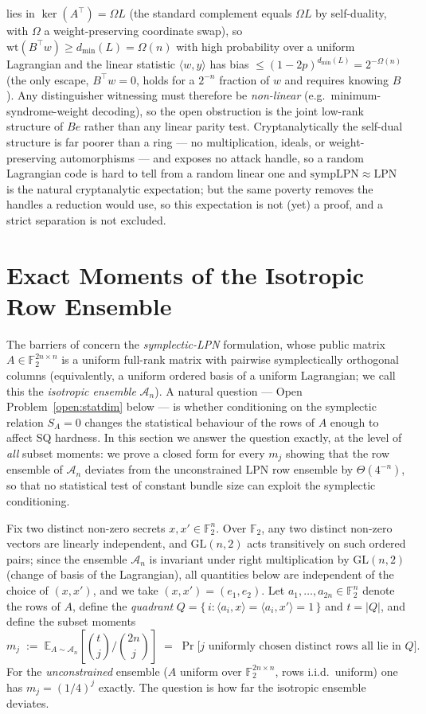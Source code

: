 \documentclass[11pt,a4paper]{article}
\theoremstyle{plain}
\theoremstyle{definition}
\newcommand{\F}{\mathbb{F}}
\newcommand{\E}{\mathbb{E}}
\begin{document}
lies in $\ker(A^{\top})=\Omega L$ (the standard complement equals $\Omega L$ by self-duality, with $\Omega$ a weight-preserving coordinate swap), so $\mathrm{wt}(B^{\top}w)\ge d_{\min}(L)=\Omega(n)$ with high probability over a uniform Lagrangian and the linear statistic $\langle w,y\rangle$ has bias $\le(1-2p)^{d_{\min}(L)}=2^{-\Omega(n)}$ (the only escape, $B^{\top}w=0$, holds for a $2^{-n}$ fraction of $w$ and requires knowing $B$). Any distinguisher witnessing  must therefore be \emph{non-linear} (e.g.\ minimum-syndrome-weight decoding), so the open obstruction is the joint low-rank structure of $Be$ rather than any linear parity test. Cryptanalytically the self-dual structure is far poorer than a ring --- no multiplication, ideals, or weight-preserving automorphisms --- and exposes no attack handle, so a random Lagrangian code is hard to tell from a random linear one and $\mathrm{sympLPN}\approx\mathrm{LPN}$ is the natural cryptanalytic expectation; but the same poverty removes the handles a reduction would use, so this expectation is not (yet) a proof, and a strict separation is not excluded.


\section{Exact Moments of the Isotropic Row Ensemble}
\label{sec:moments}

The barriers of  concern the \emph{symplectic-LPN} formulation, whose public matrix $A \in \F_2^{2n \times n}$ is a uniform full-rank matrix with pairwise symplectically orthogonal columns (equivalently, a uniform ordered basis of a uniform Lagrangian; we call this the \emph{isotropic ensemble} $\mathcal{A}_n$). A natural question --- Open Problem~\ref{open:statdim} below --- is whether conditioning on the symplectic relation $S_A = 0$ changes the statistical behaviour of the rows of $A$ enough to affect SQ hardness. In this section we answer the question exactly, at the level of \emph{all} subset moments: we prove a closed form for every $m_j$ showing that the row ensemble of $\mathcal{A}_n$ deviates from the unconstrained LPN row ensemble by $\Theta(4^{-n})$, so that no statistical test of constant bundle size can exploit the symplectic conditioning.

Fix two distinct non-zero secrets $x, x' \in \F_2^n$. Over $\F_2$, any two distinct non-zero vectors are linearly independent, and $\mathrm{GL}(n,2)$ acts transitively on such ordered pairs; since the ensemble $\mathcal{A}_n$ is invariant under right multiplication by $\mathrm{GL}(n,2)$ (change of basis of the Lagrangian), all quantities below are independent of the choice of $(x,x')$, and we take $(x,x') = (e_1, e_2)$. Let $a_1, \dots, a_{2n} \in \F_2^n$ denote the rows of $A$, define the \emph{quadrant} $Q = \{\, i : \langle a_i, x\rangle = \langle a_i, x'\rangle = 1 \,\}$ and $t = |Q|$, and define the subset moments
\[
m_j \;:=\; \E_{A \sim \mathcal{A}_n}\!\left[\binom{t}{j}\Big/\binom{2n}{j}\right]
\;=\; \Pr\bigl[\text{$j$ uniformly chosen distinct rows all lie in } Q\bigr].
\]
For the \emph{unconstrained} ensemble ($A$ uniform over $\F_2^{2n\times n}$, rows i.i.d.\ uniform) one has $m_j = (1/4)^j$ exactly. The question is how far the isotropic ensemble deviates.
\end{document}
